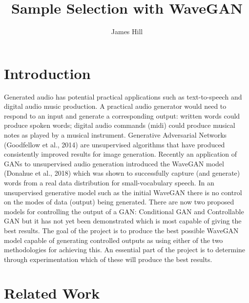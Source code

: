 \documentclass{article}
\title{Sample Selection with WaveGAN}
\author{James Hill}
\date{}
\begin{document}
\maketitle

\section{Introduction}

Generated audio has potential practical applications such as text-to-speech and digital audio music production.
A practical audio generator would need to respond to an input and generate a corresponding output: written words could produce spoken words; digital audio commands (midi) could produce musical notes as played by a musical instrument.
\newline
\newline
Generative Adversarial Networks (Goodfellow et al., 2014) are unsupervised algorithms that have produced consistently improved results for image generation.
Recently an application of GANs to unsupervised audio generation introduced the WaveGAN model (Donahue et al., 2018) which was shown to successfully capture (and generate) words from a real data distribution for small-vocabulary speech.
\newline
\newline
In an unsupervised generative model such as the initial WaveGAN there is no control on the modes of data (output) being generated.
There are now two proposed models for controlling the output of a GAN: Conditional GAN and Controllable GAN but it has not yet been demonstrated which is most capable of giving the best results.
\newline
\newline
The goal of the project is to produce the best possible WaveGAN model capable of generating controlled outputs as using either of the two methodologies for achieving this.
An essential part of the project is to determine through experimentation which of these will produce the best results.

\section{Related Work}
\end{document}
